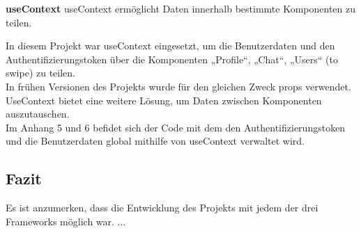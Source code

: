 
\textbf{useContext}
useContext ermöglicht Daten innerhalb bestimmte Komponenten zu teilen.

In diesem Projekt war useContext eingesetzt, um die Benutzerdaten und den Authentifizierungstoken über die Komponenten  „Profile“, „Chat“, „Users“ (to swipe) zu teilen.
\\
In frühen Versionen des Projekts wurde für den gleichen Zweck props verwendet.  {\cite{R03}}
UseContext bietet eine weitere Lösung, um Daten zwischen Komponenten auszutauschen.{\cite{R04}}
\\

Im Anhang 5 und 6 befidet sich der Code mit dem den Authentifizierungstoken und die Benutzerdaten global  mithilfe von useContext verwaltet wird.

\subsection{Fazit}
Es ist anzumerken, dass die Entwicklung des Projekts mit jedem der drei Frameworks möglich war.
...